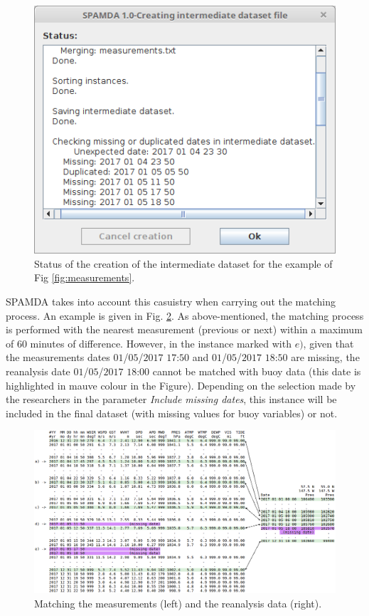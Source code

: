 \documentclass[energies,article,submit,moreauthors,pdftex]{Definitions/mdpi}
\begin{document}
		\begin{figure}[ht!]
			\centering
			\includegraphics[scale=0.40]{figures/FigureCreatingDataset.png}
			\caption{Status of the creation of the intermediate dataset for the example of Fig \ref{fig:measurements}.}
			\label{fig:creatingDataset}
		\end{figure}
		
		SPAMDA takes into account this casuistry when carrying out the matching process. An example is given in Fig. \ref{fig:matchingMeasurements}. As above-mentioned, the matching process is performed with the nearest measurement (previous or next) within a maximum of 60 minutes of difference. However, in the instance marked with $e)$, given that the measurements dates $01$/$05$/$2017$ $17$:$50$ and $01$/$05$/$2017$ $18$:$50$ are missing, the reanalysis date $01$/$05$/$2017$ $18$:$00$ cannot be matched with buoy data (this date is highlighted in mauve colour in the Figure). Depending on the selection made by the researchers in the parameter \textit{Include missing dates}, this instance will be included in the final dataset (with missing values for buoy variables) or not.
		
		\begin{figure}[ht!]
			\centering
			\includegraphics[scale=0.36]{figures/FigureMatchingMeasurements.png}
			\caption{Matching the measurements (left) and the reanalysis data (right).}
			\label{fig:matchingMeasurements}
		\end{figure}
		
\end{document}
